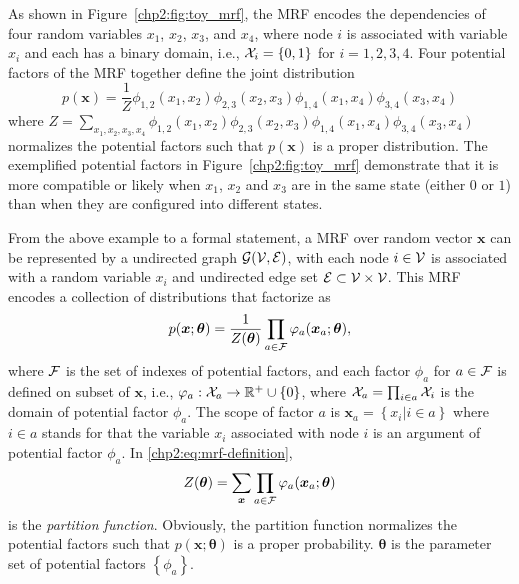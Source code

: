 \begin{example}\label{chpt2:mrf-3node-example}
  As shown in Figure~\ref{chp2:fig:toy_mrf}, the MRF encodes the dependencies of four random variables $x_1$, $x_2$, $x_3$, and $x_4$, where node $i$ is associated with variable $x_i$ and each has a binary domain, i.e., $\mathcal{X}_i = \{0,1\}$ for $i =1, 2, 3, 4$. Four potential factors of the MRF together define the joint distribution
  \begin{equation*}
    p(\bm{x}) = \frac{1}{Z} \phi_{1,2}(x_1, x_2) \phi_{2,3}(x_2, x_3) \phi_{1,4}(x_1, x_4)\phi_{3,4}(x_3, x_4)
  \end{equation*}
  where $Z = \sum_{x_1, x_2, x_3, x_4}\phi_{1,2}(x_1, x_2) \phi_{2,3}(x_2, x_3) \phi_{1,4}(x_1, x_4)\phi_{3,4}(x_3, x_4)$ normalizes the potential factors such that $p(\bm{x})$ is a proper distribution. The exemplified potential factors in Figure~\ref{chp2:fig:toy_mrf} demonstrate that it is more compatible or likely when $x_1$, $x_2$ and $x_3$ are in the same state (either $0$ or $1$) than when they are configured into different states.
\end{example}

From the above example to a formal statement, a MRF over random vector $\bm{x}$ can be represented by a undirected graph $\mathcal{G}(\mathcal{V}, \mathcal{E})$, with each node $i \in \mathcal{V}$ is associated with a random variable $x_i$ and undirected edge set $\mathcal{E} \subset \mathcal{V} \times \mathcal{V}$. This MRF encodes a collection of distributions that factorize as
\begin{equation}\label{chp2:eq:mrf-definition}
  p(\bm{x};\bm{\theta}) = \frac{1}{Z(\bm{\theta})} \prod_{a \in \mathcal{F}} \varphi_{a}(\bm{x}_{a};\bm{\theta}),
\end{equation}
where $\mathcal{F}$ is the set of indexes of potential factors, and each factor $\phi_{a}$ for $a\in \mathcal{F}$ is defined on subset of $\bm{x}$, i.e., $\varphi_{a}: \mathcal{X}_{a} \rightarrow \mathbb{R}^{+} \cup \{0\}$, where $\mathcal{X}_{a} = \prod_{i\in a}\mathcal{X}_i$ is the domain of potential factor $\phi_{a}$. The scope of factor $a$ is $\bm{x}_{a} = \left\{ x_i| i\in a \right\}$ where $i \in a$ stands for that the variable $x_i$ associated with node $i$ is an argument of potential factor $\phi_{a}$. In \eqref{chp2:eq:mrf-definition},
\begin{equation}
  Z(\bm{\theta}) = \sum_{\bm{x}} \prod_{a \in \mathcal{F}} \varphi_{a}(\bm{x}_{a};\bm{\theta})
\end{equation}
is the \textit{partition function}. Obviously, the partition function normalizes the potential factors such that $p(\bm{x}; \bm{\theta})$ is a proper probability. $\bm{\theta}$ is the parameter set of potential factors $\left\{ \phi_a \right\}$.


